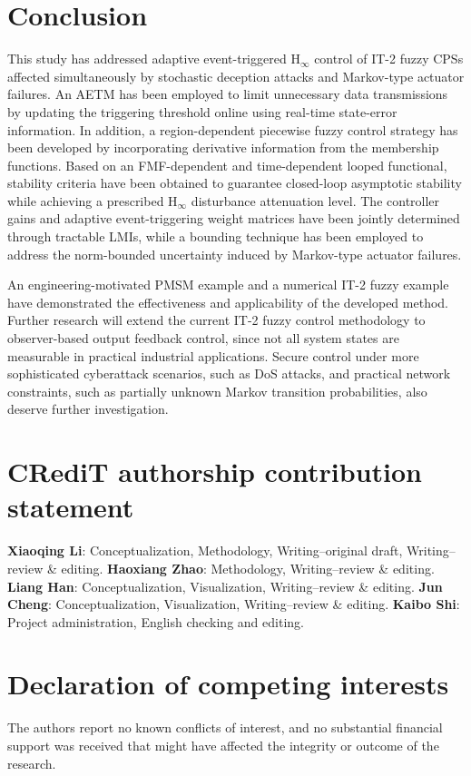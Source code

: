\documentclass[preprint,review,fleqn,sort&compress,3p]{elsarticle}
\theoremstyle{definition} %
\theoremstyle{definition}%
\begin{document}
\section{Conclusion} \label{sec5}
This study has addressed adaptive event-triggered $\mathrm{H}_{\infty}$ control of IT-2 fuzzy CPSs affected simultaneously by stochastic deception attacks and Markov-type actuator failures. An AETM has been employed to limit unnecessary data transmissions by updating the triggering threshold online using real-time state-error information. In addition, a region-dependent piecewise fuzzy control strategy has been developed by incorporating derivative information from the membership functions. Based on an FMF-dependent and time-dependent looped functional, stability criteria have been obtained to guarantee closed-loop asymptotic stability while achieving a prescribed $\mathrm{H}_{\infty}$ disturbance attenuation level. The controller gains and adaptive event-triggering weight matrices have been jointly determined through tractable LMIs, while a bounding technique has been employed to address the norm-bounded uncertainty induced by Markov-type actuator failures.

An engineering-motivated PMSM example and a numerical IT-2 fuzzy example have demonstrated the effectiveness and applicability of the developed method. Further research will extend the current IT-2 fuzzy control methodology to observer-based output feedback control, since not all system states are measurable in practical industrial applications. Secure control under more sophisticated cyberattack scenarios, such as DoS attacks, and practical network constraints, such as partially unknown Markov transition probabilities, also deserve further investigation.


\section*{CRediT authorship contribution statement}
{\bf Xiaoqing Li}: Conceptualization, Methodology, Writing--original draft, Writing--review \& editing. %
{\bf Haoxiang Zhao}: Methodology, Writing--review \& editing. 
{\bf Liang Han}: Conceptualization, Visualization, Writing--review \& editing.
{\bf Jun Cheng}: Conceptualization, Visualization, Writing--review \& editing. 
{\bf Kaibo Shi}: Project administration, English checking and editing. 
\section*{Declaration of competing interests}
The authors report no known conflicts of interest, and no substantial financial support was received that might have affected the integrity or outcome of the research.
\end{document}

